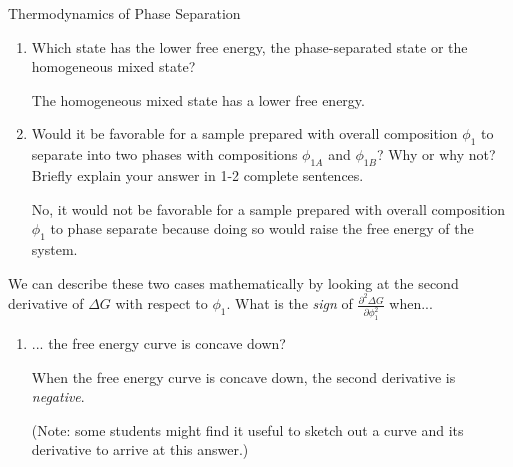 \begin{activity}{Thermodynamics of Phase Separation}
\begin{ctqs}
\begin{enumerate}
					\begin{solution}[0.75in]{}
					
						Point (ii) (it is on the line connecting the two phase-separated compositions.)
						
					\end{solution}
					
				\item Which state has the lower free energy, the phase-separated state or the homogeneous mixed state?
					
					\begin{solution}[0.75in]{}
					
						The homogeneous mixed state has a lower free energy.
					
					\end{solution}
					
				\item Would it be favorable for a sample prepared with overall composition $\phi_1$ to separate into two phases with compositions $\phi_{1A}$ and $\phi_{1B}$?  Why or why not?  Briefly explain your answer in 1-2 complete sentences.
					
					\begin{solution}[2in]{}
					
						No, it would not be favorable for a sample prepared with overall composition $\phi_1$ to phase separate because doing so would raise the free energy of the system.
					
					\end{solution}
					
			\end{enumerate}
			
		\question We can describe these two cases mathematically by looking at the second derivative of $\Delta G$ with respect to $\phi_1$.		
			What is the \emph{sign} of $\frac{\partial^2 \Delta G}{\partial \phi_1^2}$ when...
			
			\begin{enumerate}
				\item ... the free energy curve is concave down?
					
					\begin{solution}[1in]{}
					
						When the free energy curve is concave down, the second derivative is \emph{negative}.
						
						(Note: some students might find it useful to sketch out a curve and its derivative to arrive at this answer.)
					

\end{solution}
\end{enumerate}
\end{ctqs}
\end{activity}
